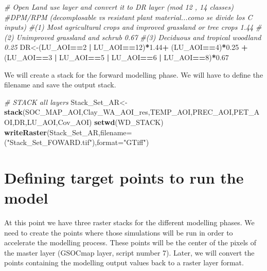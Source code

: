 \documentclass[
  10pt,
  b5paper,
]{book}
\newenvironment{Shaded}{\begin{snugshade}}{\end{snugshade}}
\newcommand{\CommentTok}[1]{\textcolor[rgb]{0.56,0.35,0.01}{\textit{#1}}}
\newcommand{\DataTypeTok}[1]{\textcolor[rgb]{0.13,0.29,0.53}{#1}}
\newcommand{\DecValTok}[1]{\textcolor[rgb]{0.00,0.00,0.81}{#1}}
\newcommand{\FloatTok}[1]{\textcolor[rgb]{0.00,0.00,0.81}{#1}}
\newcommand{\KeywordTok}[1]{\textcolor[rgb]{0.13,0.29,0.53}{\textbf{#1}}}
\newcommand{\NormalTok}[1]{#1}
\newcommand{\OperatorTok}[1]{\textcolor[rgb]{0.81,0.36,0.00}{\textbf{#1}}}
\newcommand{\StringTok}[1]{\textcolor[rgb]{0.31,0.60,0.02}{#1}}
\begin{document}
\begin{Shaded}
\begin{Highlighting}[]
\CommentTok{# Open Land use layer and convert it to DR layer (mod 12 , 14 classes)}
\CommentTok{#DPM/RPM (decomplosable vs resistant plant material...como se divide los C inputs)}
\CommentTok{#(1) Most agricultural crops and improved grassland or tree crops 1.44 }
\CommentTok{#(2) Unimproved grassland and schrub 0.67}
\CommentTok{#(3) Deciduous and tropical woodland 0.25    }
\NormalTok{DR<-(LU_AOI}\OperatorTok{==}\DecValTok{2} \OperatorTok{|}\StringTok{ }\NormalTok{LU_AOI}\OperatorTok{==}\DecValTok{12}\NormalTok{)}\OperatorTok{*}\FloatTok{1.44}\OperatorTok{+}\StringTok{ }\NormalTok{(LU_AOI}\OperatorTok{==}\DecValTok{4}\NormalTok{)}\OperatorTok{*}\FloatTok{0.25} \OperatorTok{+}\StringTok{ }\NormalTok{(LU_AOI}\OperatorTok{==}\DecValTok{3} \OperatorTok{|}\StringTok{ }\NormalTok{LU_AOI}\OperatorTok{==}\DecValTok{5} \OperatorTok{|}\StringTok{ }\NormalTok{LU_AOI}\OperatorTok{==}\DecValTok{6} \OperatorTok{|}\StringTok{ }\NormalTok{LU_AOI}\OperatorTok{==}\DecValTok{8}\NormalTok{)}\OperatorTok{*}\FloatTok{0.67}
\end{Highlighting}
\end{Shaded}

We will create a stack for the forward modelling phase. We will have to define the filename and save the output stack.

\begin{Shaded}
\begin{Highlighting}[]
\CommentTok{# STACK all layers}
\NormalTok{Stack_Set_AR<-}\KeywordTok{stack}\NormalTok{(SOC_MAP_AOI,Clay_WA_AOI_res,TEMP_AOI,PREC_AOI,PET_AOI,DR,LU_AOI,Cov_AOI)}
\KeywordTok{setwd}\NormalTok{(WD_STACK)}
\KeywordTok{writeRaster}\NormalTok{(Stack_Set_AR,}\DataTypeTok{filename=}\NormalTok{(}\StringTok{"Stack_Set_FOWARD.tif"}\NormalTok{),}\DataTypeTok{format=}\StringTok{"GTiff"}\NormalTok{)}
\end{Highlighting}
\end{Shaded}

\hypertarget{defining-target-points-to-run-the-model}{%
\section{Defining target points to run the model}\label{defining-target-points-to-run-the-model}}

At this point we have three raster stacks for the different modelling phases. We need to create the points where those simulations will be run in order to accelerate the modelling process. These points will be the center of the pixels of the master layer (GSOCmap layer, script number 7). Later, we will convert the points containing the modelling output values back to a raster layer format.
\end{document}
